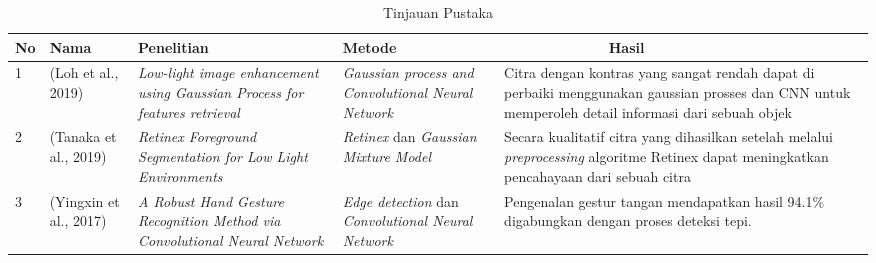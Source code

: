 \begin{table}[htbp]
	\caption{Tinjauan Pustaka}
	\label{labelku}
	\vspace{0cm}
	
	\begin{tabular}{|p{0.5cm}|p{2cm}|p{3cm}|p{3cm}|p{4cm}|}
		\hline
		No \centering & Nama \centering &\centering  Penelitian & \centering Metode & \ \ \ \ \ \ \ \ \  \ \ \ \ Hasil \\
		
		\hline
		1 & (Loh et al., 2019) & \emph{Low-light image enhancement using Gaussian Process for features retrieval} & \emph{Gaussian process and Convolutional Neural Network} & Citra dengan kontras yang sangat rendah dapat di perbaiki menggunakan gaussian prosses dan CNN untuk memperoleh detail informasi dari sebuah objek \\
		
		\hline
		2 & (Tanaka et al., 2019) & \emph{Retinex Foreground Segmentation for Low Light Environments} & \emph{Retinex} dan \emph{Gaussian Mixture Model} & Secara kualitatif citra yang dihasilkan setelah melalui \emph{preprocessing} algoritme Retinex dapat meningkatkan pencahayaan dari sebuah citra\\
		
		\hline
		3 & (Yingxin et al., 2017) & \emph{A Robust Hand Gesture Recognition Method via Convolutional Neural Network} & \emph{Edge detection} dan \emph{Convolutional Neural Network} & Pengenalan gestur tangan mendapatkan hasil 94.1\% digabungkan dengan proses deteksi tepi.\\
		\hline
	\end{tabular}
\end{table}

